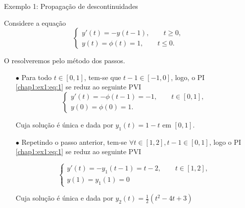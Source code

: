 \documentclass{beamer}
\theoremstyle{plain}
\theoremstyle{definition}
\begin{document}
\begin{frame}{Exemplo 1: Propagação de descontinuidades}

    \scriptsize
        Considere a equação
        \begin{equation}
            \begin{cases}
                y'(t) = -y(t - 1), \qquad t \geq 0, \\
                y(t) = \phi(t) = 1, \qquad t \leq 0.
            \end{cases} 
            \label{chap1:ex1:eq:1}
        \end{equation}


    O resolveremos pelo método dos passos.

        \begin{itemize}
            \item[$\bullet$] Para todo $t \in [0,1]$, tem-se que $t-1 \in [-1, 0]$, logo, o PI \eqref{chap1:ex1:eq:1} se reduz ao seguinte PVI
                \begin{equation*}
                    \begin{cases}
                        y'(t) = -\phi(t - 1) = -1, \qquad t \in [0, 1], \\
                        y(0) = \phi(0) = 1.
                    \end{cases} 
                \end{equation*}

                Cuja solução é única e dada por $y_1(t) = 1 - t$ em $[0, 1]$. 
        
            \item[$\bullet$] Repetindo o passo anterior, tem-se $\forall t \in [1, 2], t - 1 \in [0, 1]$, logo o PI \eqref{chap1:ex1:eq:1} se reduz ao seguinte PVI

                \begin{equation*}
                    \begin{cases}
                        y'(t) = - y_1(t - 1) = t - 2 , \qquad t \in [1, 2], \\
                        y(1) = y_1(1) = 0
                    \end{cases} 
                \end{equation*}

                Cuja solução é única e dada por $y_2(t) = \frac{1}{2}(t^2 - 4t + 3)$


        \end{itemize}


\end{frame}
\end{document}
